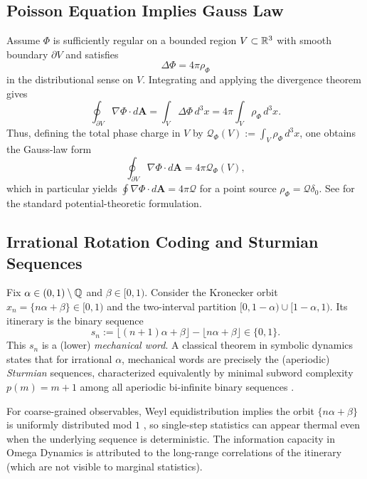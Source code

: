 \subsection{Poisson Equation Implies Gauss Law}
\label{app:poisson_gauss}
Assume $\Phi$ is sufficiently regular on a bounded region $V\subset\mathbb{R}^3$ with smooth boundary $\partial V$ and satisfies
\begin{equation}
  \Delta \Phi = 4\pi \rho_\Phi
\end{equation}
in the distributional sense on $V$. Integrating and applying the divergence theorem gives
\begin{equation}
  \oint_{\partial V}\nabla\Phi\cdot d\mathbf{A}
  =\int_V \Delta\Phi\,d^3x
  =4\pi\int_V\rho_\Phi\,d^3x.
\end{equation}
Thus, defining the total phase charge in $V$ by $\mathcal{Q}_\Phi(V):=\int_V\rho_\Phi\,d^3x$, one obtains the Gauss-law form
\begin{equation}
  \oint_{\partial V}\nabla\Phi\cdot d\mathbf{A}=4\pi \mathcal{Q}_\Phi(V),
\end{equation}
which in particular yields $\oint\nabla\Phi\cdot d\mathbf{A}=4\pi \mathcal{Q}$ for a point source $\rho_\Phi=\mathcal{Q}\delta_0$.
See \cite{Jackson1998} for the standard potential-theoretic formulation.

\subsection{Irrational Rotation Coding and Sturmian Sequences}
\label{app:sturmian}
Fix $\alpha\in(0,1)\setminus\mathbb{Q}$ and $\beta\in[0,1)$. Consider the Kronecker orbit $x_n=\{n\alpha+\beta\}\in[0,1)$ and the two-interval partition $[0,1-\alpha)\cup[1-\alpha,1)$. Its itinerary is the binary sequence
\begin{equation}
  s_n := \lfloor (n+1)\alpha+\beta\rfloor-\lfloor n\alpha+\beta\rfloor\in\{0,1\}.
\end{equation}
This $s_n$ is a (lower) \emph{mechanical word}. A classical theorem in symbolic dynamics states that for irrational $\alpha$, mechanical words are precisely the (aperiodic) \emph{Sturmian} sequences, characterized equivalently by minimal subword complexity $p(m)=m+1$ among all aperiodic bi-infinite binary sequences \cite{MorseHedlund1940, Lothaire2002, LindMarcus1995}.

For coarse-grained observables, Weyl equidistribution implies the orbit $\{n\alpha+\beta\}$ is uniformly distributed mod $1$ \cite{Weyl1916}, so single-step statistics can appear thermal even when the underlying sequence is deterministic. The information capacity in Omega Dynamics is attributed to the long-range correlations of the itinerary (which are not visible to marginal statistics).

